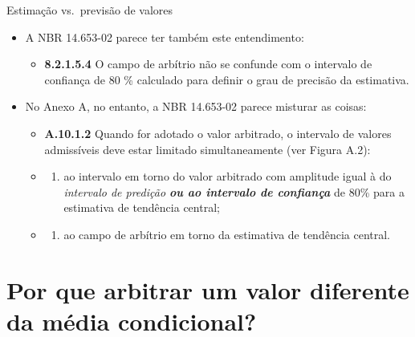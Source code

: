 \documentclass[9pt,ignorenonframetext,aspectratio=169]{beamer}
\providecommand{\tightlist}{%
  \setlength{\itemsep}{0pt}\setlength{\parskip}{0pt}}
\begin{document}
\begin{frame}{Estimação vs.~previsão de valores}
\protect\hypertarget{estimauxe7uxe3o-vs.-previsuxe3o-de-valores-1}{}

\begin{itemize}[<+->]
\tightlist
\item
  A NBR 14.653-02\autocite{NBR1465302} parece ter também este
  entendimento:

  \begin{itemize}[<+->]
  \tightlist
  \item
    \textbf{8.2.1.5.4} O campo de arbítrio não se confunde com o
    intervalo de confiança de 80 \% calculado para definir o grau de
    precisão da estimativa.
  \end{itemize}
\item
  No Anexo A, no entanto, a NBR 14.653-02 \autocite{NBR1465302} parece
  misturar as coisas:

  \begin{itemize}[<+->]
  \item
    \textbf{A.10.1.2} Quando for adotado o valor arbitrado, o intervalo
    de valores admissíveis deve estar limitado simultaneamente (ver
    Figura A.2):\\
  \item
    \begin{enumerate}[<+->]
    [a)]
    \tightlist
    \item
      ao intervalo em torno do valor arbitrado com amplitude igual à do
      \emph{intervalo de predição \textbf{ou ao intervalo de confiança}}
      de 80\% para a estimativa de tendência central;
    \end{enumerate}
  \item
    \begin{enumerate}[<+->]
    [a)]
    \setcounter{enumi}{1}
    \tightlist
    \item
      ao campo de arbítrio em torno da estimativa de tendência central.
    \end{enumerate}
  \end{itemize}
\end{itemize}

\end{frame}

\hypertarget{por-que-arbitrar-um-valor-diferente-da-muxe9dia-condicional}{%
\section{Por que arbitrar um valor diferente da média
condicional?}\label{por-que-arbitrar-um-valor-diferente-da-muxe9dia-condicional}}
\end{document}
